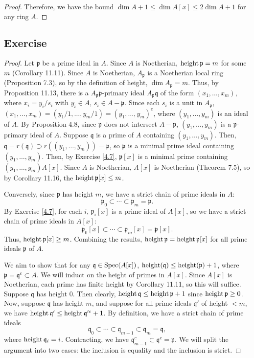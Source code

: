 \begin{proof}
Therefore, we have the bound $\dim A + 1 \le \dim A[x] \le 2 \dim A + 1$ for any ring $A$.
\end{proof}

\subsection{Exercise}\label{11.7}

\begin{proof}
Let $\mathfrak{p}$ be a prime ideal in $A$. Since $A$ is Noetherian, $\operatorname{height} \mathfrak{p} = m$ for some $m$ (Corollary 11.11). Since $A$ is Noetherian, $A_{\mathfrak{p}}$ 
is a Noetherian local ring (Proposition 7.3), so by the definition of height, $\dim A_{\mathfrak{p}} = m$. Thus, by Proposition 11.13, there is a 
$A_{\mathfrak{p}}\mathfrak{p}$-primary ideal $A_{\mathfrak{p}}\mathfrak{q}$ of the form $(x_1,\ldots,x_m)$, where $x_i = y_i/s_i$ with $y_i \in A$, $s_i \in A - \mathfrak{p}$. 
Since each $s_i$ is a unit in $A_{\mathfrak{p}}$, $(x_1,\ldots,x_m) = (y_1/1,\ldots,y_m/1) = (y_1,\ldots,y_m)^e$, where $(y_1,\ldots,y_m)$ is an ideal of $A$. By 
Proposition 4.8, since $\mathfrak{p}$ does not intersect $A - \mathfrak{p}$, $(y_1,\ldots,y_m)$ is a $\mathfrak{p}$-primary ideal of $A$. Suppose $\mathfrak{q}$ is a prime 
of $A$ containing $(y_1,\ldots,y_m)$. Then, $\mathfrak{q} = r(\mathfrak{q}) \supset r((y_1,\ldots,y_m)) = \mathfrak{p}$, so $\mathfrak{p}$ is a minimal prime ideal containing 
$(y_1,\ldots,y_m)$. Then, by Exercise \ref{4.7}, $\mathfrak{p}[x]$ is a minimal prime containing $(y_1,\ldots,y_m)A[x]$. Since $A$ is Noetherian, $A[x]$ is Noetherian (Theorem 7.5), 
so by Corollary 11.16, the $\operatorname{height} \mathfrak{p}[x] \le m$.

Conversely, since $\mathfrak{p}$ has height $m$, we have a strict chain of prime ideals in $A$:
$$\mathfrak{p}_0 \subset \cdots \subset \mathfrak{p}_m = \mathfrak{p}.$$
By Exercise \ref{4.7}, for each $i$, $\mathfrak{p}_i[x]$ is a prime ideal of $A[x]$, so we have a strict chain of prime ideals in $A[x]$:
$$\mathfrak{p}_0[x] \subset \cdots \subset \mathfrak{p}_m[x] = \mathfrak{p}[x].$$
Thus, $\operatorname{height} \mathfrak{p}[x] \ge m$. Combining the results, $\operatorname{height} \mathfrak{p} = \operatorname{height} \mathfrak{p}[x]$ for all
prime ideals $\mathfrak{p}$ of $A$.

We aim to show that for any $\mathfrak{q} \in \operatorname{Spec}(A[x])$, $\operatorname{height}(\mathfrak{q}) \le \operatorname{height}(\mathfrak{p}) + 1$, where $\mathfrak{p} = \mathfrak{q}^c \subset A$. We will induct on 
the height of primes in $A[x]$. Since $A[x]$ is Noetherian, each prime has finite height by Corollary 11.11, so this will suffice. 
Suppose $\mathfrak{q}$ has height $0$. Then clearly, $\operatorname{height} \mathfrak{q} \le \operatorname{height} \mathfrak{p} + 1$ since $\operatorname{height} \mathfrak{p} \ge 0$. Now, suppose $\mathfrak{q}$ has height $m$,
and suppose for all prime ideals $\mathfrak{q}'$ of height $< m$, we have $\operatorname{height} \mathfrak{q}' \le \operatorname{height} \mathfrak{q}'^c + 1$. By definition, we have a strict chain of prime ideals
$$\mathfrak{q}_0 \subset \cdots \subset \mathfrak{q}_{m-1} \subset \mathfrak{q}_m = \mathfrak{q},$$
where $\operatorname{height} \mathfrak{q}_i = i$. Contracting, we have $\mathfrak{q}_{m-1}^c \subset \mathfrak{q}^c = \mathfrak{p}$. We will split the argument into two cases: the inclusion is 
equality and the inclusion is strict.


\end{proof}
